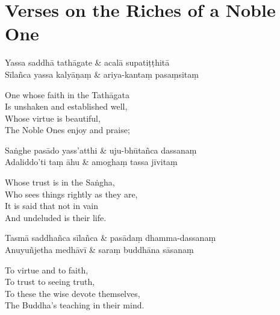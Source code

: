 \section{Verses on the Riches of a Noble One}



\begin{leader}
\end{leader}

\begin{twochants}
  Yassa saddhā tathāgate & acalā supatiṭṭhitā \\
  Sīlañca yassa kalyāṇaṃ & ariya-kantaṃ pasaṃsitaṃ \\
\end{twochants}

\begin{english}
  One whose faith in the Tathāgata\\
  Is unshaken and established well,\\
  Whose virtue is beautiful,\\
  The Noble Ones enjoy and praise;
\end{english}

\begin{twochants}
  Saṅghe pasādo yass'atthi & uju-bhūtañca dassanaṃ \\
  Adaliddo'ti taṃ āhu & amoghaṃ tassa jīvitaṃ \\
\end{twochants}

\begin{english}
  Whose trust is in the Saṅgha,\\
  Who sees things rightly as they are,\\
  It is said that not in vain\\
  And undeluded is their life.
\end{english}

\begin{twochants}
  Tasmā saddhañca sīlañca & pasādaṃ dhamma-dassanaṃ \\
  Anuyuñjetha medhāvī & saraṃ buddhāna sāsanaṃ \\
\end{twochants}

\begin{english}
  To virtue and to faith,\\
  To trust to seeing truth,\\
  To these the wise devote themselves,\\
  The Buddha's teaching in their mind.
\end{english}


